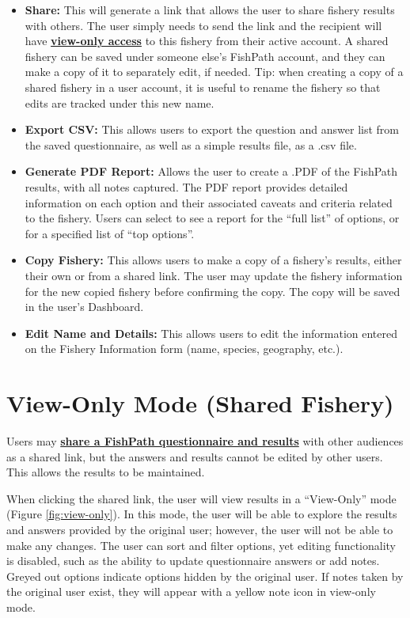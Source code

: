 \documentclass[
  11pt,
]{book}
\providecommand{\tightlist}{%
  \setlength{\itemsep}{0pt}\setlength{\parskip}{0pt}}
\begin{document}
\begin{itemize}
\tightlist
\item
  \textbf{Share:} This will generate a link that allows the user to share fishery results with others. The user simply needs to send the link and the recipient will have \protect\hyperlink{view-only-mode-shared-fishery}{\textbf{view-only access}} to this fishery from their active account. A shared fishery can be saved under someone else's FishPath account, and they can make a copy of it to separately edit, if needed. Tip: when creating a copy of a shared fishery in a user account, it is useful to rename the fishery so that edits are tracked under this new name.
\item
  \textbf{Export CSV:} This allows users to export the question and answer list from the saved questionnaire, as well as a simple results file, as a .csv file.
\item
  \textbf{Generate PDF Report:} Allows the user to create a .PDF of the FishPath results, with all notes captured. The PDF report provides detailed information on each option and their associated caveats and criteria related to the fishery. Users can select to see a report for the ``full list'' of options, or for a specified list of ``top options''.
\item
  \textbf{Copy Fishery:} This allows users to make a copy of a fishery's results, either their own or from a shared link. The user may update the fishery information for the new copied fishery before confirming the copy. The copy will be saved in the user's Dashboard.
\item
  \textbf{Edit Name and Details:} This allows users to edit the information entered on the Fishery Information form (name, species, geography, etc.).
\end{itemize}

\hypertarget{view-only-mode-shared-fishery}{%
\section{View-Only Mode (Shared Fishery)}\label{view-only-mode-shared-fishery}}

Users may \protect\hyperlink{Results-Actions}{\textbf{share a FishPath questionnaire and results}} with other audiences as a shared link, but the answers and results cannot be edited by other users. This allows the results to be maintained.

When clicking the shared link, the user will view results in a ``View-Only'' mode (Figure \ref{fig:view-only}). In this mode, the user will be able to explore the results and answers provided by the original user; however, the user will not be able to make any changes. The user can sort and filter options, yet editing functionality is disabled, such as the ability to update questionnaire answers or add notes. Greyed out options indicate options hidden by the original user. If notes taken by the original user exist, they will appear with a yellow note icon in view-only mode.
\end{document}
